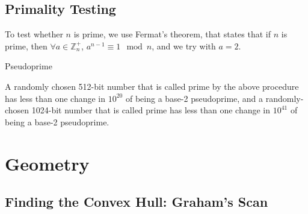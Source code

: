 \documentclass[a4paper, 12pt]{article}
\begin{document}
  \subsection{Primality Testing}

To test whether $n$ is prime, we use Fermat's theorem, that states that if $n$ is prime, then $\forall a \in\mathbb{Z}_n^+$, $a^{n-1} \equiv 1\mod{n}$, and we try with $a=2$.

\vspace{0.5cm}
\IncMargin{2em}
\begin{algorithm}[H]
\caption{Pseudoprime}
\vspace{0.1cm}
\Indm
{}
\Indp
\vspace{0.1cm}
\end{algorithm}
\DecMargin{2em}
\vspace{0.5cm}

A randomly chosen 512-bit number that is called prime by the above procedure has less than one change in $10^{20}$ of being a base-2 pseudoprime, and a randomly-chosen 1024-bit number that is called prime has less than one change in $10^{41}$ of being a base-2 pseudoprime.

\section{Geometry}

  \subsection{Finding the Convex Hull: Graham's Scan}
\end{document}

